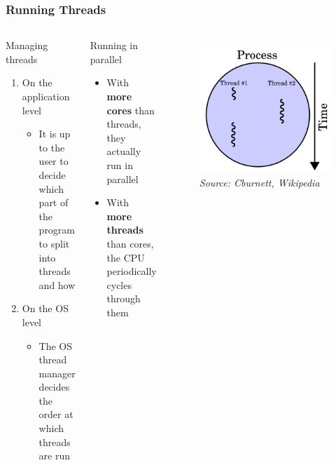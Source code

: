 \begin{frame}
\frametitle{Running Threads}

\begin{columns}
	\begin{block}{Managing threads}
		{\small
		\begin{enumerate}
			\item On the application level
			\begin{itemize}
				\item It is up to the user to decide which part of the program to split into threads and how
			\end{itemize}
			\item On the OS level
			\begin{itemize}
				\item The OS thread manager decides the order at which threads are run
			\end{itemize}
		\end{enumerate}
		}
	\end{block}

	\begin{block}{Running in parallel}
		{\small
		\begin{itemize}
			\item With \textbf{more cores} than threads, they actually run in parallel
			\item With \textbf{more threads} than cores, the CPU periodically cycles through them
		\end{itemize}
		}
	\end{block}
	
	\begin{figure}
		\includegraphics[width=\textwidth]{img/thread-serial.png}
		{\hspace*{\fill}\tiny\textit{Source: Cburnett, Wikipedia}}
	\end{figure}
	

\end{columns}
\end{frame}
